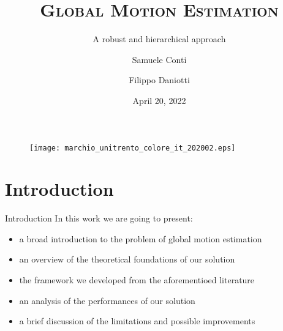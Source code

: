 \documentclass[aspectratio=1610,xcolor=dvipsnames]{beamer}
\author[Conti \and Daniotti]{Samuele Conti \and Filippo Daniotti}
\title[Global Motion Estimation]{\textsc{Global Motion Estimation}}
\subtitle{A robust and hierarchical approach}
\institute[DISI - University of Trento]{Department of Information Engineering\\and Computer Science}
\date{April 20, 2022}
\begin{document}
\begin{frame}
    \titlepage
    \begin{figure}[H]
        \begin{center}
            \texttt{[image: marchio\_unitrento\_colore\_it\_202002.eps]}
        \end{center}
    \end{figure}
\end{frame}

\begin{frame}
    \tableofcontents[sectionstyle=show,subsectionstyle=show/shaded/hide,subsubsectionstyle=show/shaded/hide]
\end{frame}

\section{Introduction}
\begin{frame}{Introduction}
    In this work we are going to present:
    \begin{itemize}
        \item a broad introduction to the problem of global motion estimation
        \item an overview of the theoretical foundations of our solution
        \item the framework we developed from the aforementioed literature
        \item an analysis of the performances of our solution 
        \item a brief discussion of the limitations and possible improvements
    \end{itemize}
\end{frame}
\end{document}
